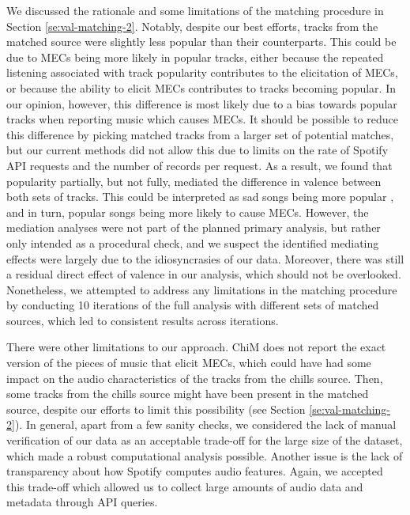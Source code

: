 We discussed the rationale and some limitations of the matching procedure in Section \ref{se:val-matching-2}. Notably, despite our best efforts, tracks from the matched source were slightly less popular than their counterparts. This could be due to MECs being more likely in popular tracks, either because the repeated listening associated with track popularity contributes to the elicitation of MECs, or because the ability to elicit MECs contributes to tracks becoming popular. In our opinion, however, this difference is most likely due to a bias towards popular tracks when reporting music which causes MECs. It should be possible to reduce this difference by picking matched tracks from a larger set of potential matches, but our current methods did not allow this due to limits on the rate of Spotify API requests and the number of records per request. As a result, we found that popularity partially, but not fully, mediated the difference in valence between both sets of tracks. This could be interpreted as sad songs being more popular \parencite[see][]{gulmatico2022}, and in turn, popular songs being more likely to cause MECs. However, the mediation analyses were not part of the planned primary analysis, but rather only intended as a procedural check, and we suspect the identified mediating effects were largely due to the idiosyncrasies of our data. Moreover, there was still a residual direct effect of valence in our analysis, which should not be overlooked. Nonetheless, we attempted to address any limitations in the matching procedure by conducting 10 iterations of the full analysis with different sets of matched sources, which led to consistent results across iterations.

There were other limitations to our approach. ChiM does not report the exact version of the pieces of music that elicit MECs, which could have had some impact on the audio characteristics of the tracks from the chills source. Then, some tracks from the chills source might have been present in the matched source, despite our efforts to limit this possibility (see Section \ref{se:val-matching-2}). In general, apart from a few sanity checks, we considered the lack of manual verification of our data as an acceptable trade-off for the large size of the dataset, which made a robust computational analysis possible. Another issue is the lack of transparency about how Spotify computes audio features. Again, we accepted this trade-off which allowed us to collect large amounts of audio data and metadata through API queries.

